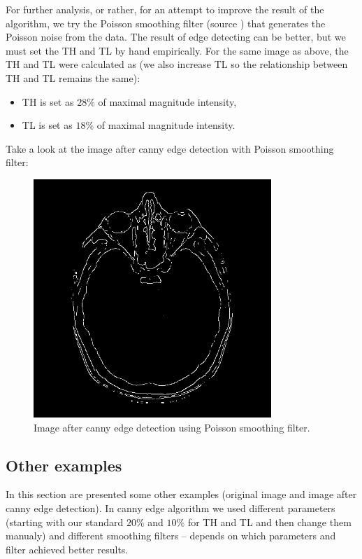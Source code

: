 \documentclass[a4paper,11pt]{article}
\begin{document}
\newpage
\noindent
For further analysis, or rather, for an attempt to improve the result of the algorithm, 
we try the Poisson smoothing filter (source \cite{bib:poiss}) that generates the Poisson noise from the data.
The result of edge detecting can be better, but we must set the TH and TL by hand empirically.
For the same image as above, the TH and TL were calculated as (we also increase TL so the relationship between TH and TL remains the same):
\begin{itemize}
    \item TH is set as $28 \%$ of maximal magnitude intensity,
    \item TL is set as $18\%$ of maximal magnitude intensity.
\end{itemize}  
Take a look at the image after canny edge detection with Poisson smoothing filter:
\begin{figure}[ht!]
    \centering
    \includegraphics[width=90mm]{0090_poisson.png}
    \caption{Image after canny edge detection using Poisson smoothing filter.}
\end{figure}

\subsection{Other examples}
In this section are presented some other examples (original image and image after canny edge detection). 
In canny edge algorithm we used different parameters (starting with our standard $20 \%$ and $10 \%$ for TH and TL and then change them manualy) and different smoothing filters -- depends on which parameters and filter achieved better results.
\end{document}
